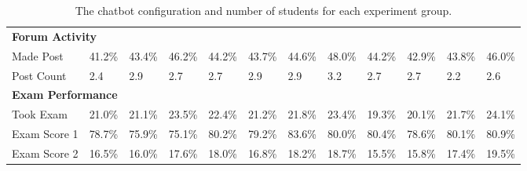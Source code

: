 \begin{table*}[t]
\begin{tcolorbox}[colback=cyan!5!white, colframe=teal!75!black, fonttitle=\bfseries, title=Experiment Groups, boxrule=0.5mm, width=\textwidth]
\begin{center}
\begin{tabularx}{\textwidth}{l|X|X|X|X|X|X|X|X|X|X|X}
\hline
\multicolumn{12}{l}{\textbf{Forum Activity}} \\ 
Made Post  & 41.2\% & 43.4\% & 46.2\% & 44.2\% & 43.7\% & 44.6\% & 48.0\% & 44.2\% & 42.9\% & 43.8\% & 46.0\% \\
Post Count  & 2.4 & 2.9 & 2.7 & 2.7 & 2.9 & 2.9 & 3.2 & 2.7 & 2.7 & 2.2 & 2.6 \\
\hline
\multicolumn{12}{l}{\textbf{Exam Performance}} \\ 
Took Exam  & 21.0\% & 21.1\% & 23.5\% & 22.4\% & 21.2\% & 21.8\% & 23.4\% & 19.3\% & 20.1\% & 21.7\% & 24.1\% \\
Exam Score 1  & 78.7\% & 75.9\% & 75.1\% & 80.2\% & 79.2\% & 83.6\% & 80.0\% & 80.4\% & 78.6\% & 80.1\% & 80.9\% \\
Exam Score 2  & 16.5\% & 16.0\% & 17.6\% & 18.0\% & 16.8\% & 18.2\% & 18.7\% & 15.5\% & 15.8\% & 17.4\% & 19.5\% \\
 \end{tabularx}
\end{center}
\end{tcolorbox}
\caption{The chatbot configuration and number of students for each experiment group.}
\label{tab:experiment-group-descriptions}
\end{table*}